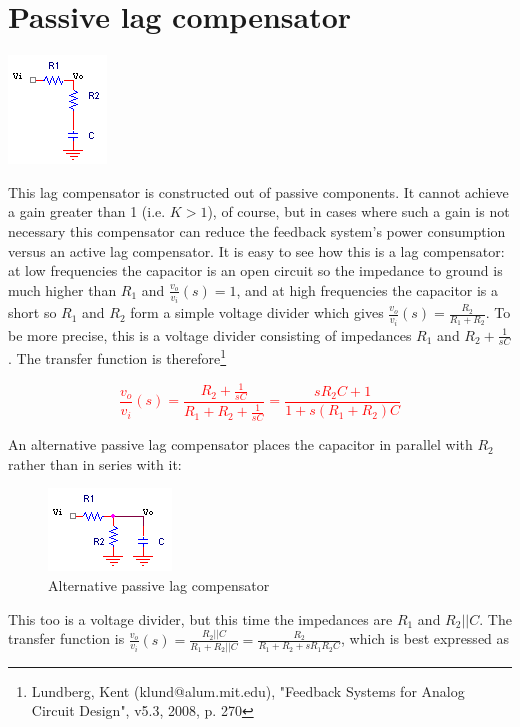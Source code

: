 \section{Passive lag compensator}
\begin{center}
	\includegraphics{schematics/passivelag.PNG}
\end{center}
This lag compensator is constructed out of passive components. It cannot achieve a gain greater than 1 (i.e. $K > 1$), of course, but in cases where such a gain is not necessary this compensator can reduce the feedback system's power consumption versus an active lag compensator. It is easy to see how this is a lag compensator: at low frequencies the capacitor is an open circuit so the impedance to ground is much higher than $R_{1}$ and $\frac{v_{o}}{v_{i}}(s) = 1$, and at high frequencies the capacitor is a short so $R_{1}$ and $R_{2}$ form a simple voltage divider which gives $\frac{v_{o}}{v_{i}}(s) = \frac{R_{2}}{R_{1}+R_{2}}$. To be more precise, this is a voltage divider consisting of impedances $R_{1}$ and $R_{2}+\frac{1}{sC}$. The transfer function is therefore\footnote{Lundberg, Kent (klund@alum.mit.edu), "Feedback Systems for Analog Circuit Design", v5.3, 2008, p. 270}

\textcolor{red}{
\begin{equation}
\frac{v_{o}}{v_{i}}(s) = \frac{R_{2}+\frac{1}{sC}}{R_{1}+R_{2}+\frac{1}{sC}} = \frac{sR_{2}C + 1}{1+s(R_{1}+R_{2})C}
\label{eq:passivelagcompensator}
\end{equation}
}

An alternative passive lag compensator places the capacitor in parallel with $R_{2}$ rather than in series with it:
\begin{figure}[h]
	\centering
		\includegraphics{schematics/passivelag2.PNG}
	\caption{Alternative passive lag compensator}
	\label{fig:passivelag2}
\end{figure}
\par
This too is a voltage divider, but this time the impedances are $R_{1}$ and $R_{2}||C$. The transfer function is $\frac{v_{o}}{v_{i}}(s) = \frac{R_{2}||C}{R_{1}+R_{2}||C} = \frac{R_{2}}{R_{1}+R_{2}+sR_{1}R_{2}C}$, which is best expressed as

